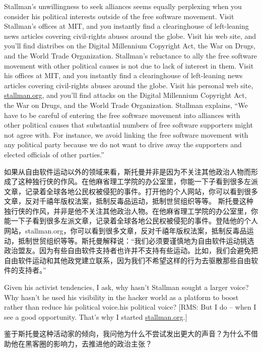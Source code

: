\ifdefined\eng
\ifdefined\vone
Stallman's unwillingness to seek alliances seems equally perplexing when you consider his political interests outside of the free software movement. Visit Stallman's offices at MIT, and you instantly find a clearinghouse of left-leaning news articles covering civil-rights abuses around the globe. Visit his web site, and you'll find diatribes on the Digital Millennium Copyright Act, the War on Drugs, and the World Trade Organization.
\fi
\ifdefined\vtwo
Stallman's reluctance to ally the free software movement with other political causes is not due to lack of interest in them.  Visit his offices at MIT, and you instantly find a clearinghouse of left-leaning news articles covering civil-rights abuses around the globe. Visit his personal web site, \url{stallman.org}, and you'll find attacks on the Digital Millennium Copyright Act, the War on Drugs, and the World Trade Organization.  Stallman explains, ``We have to be careful of entering the free software movement into alliances with other political causes that substantial numbers of free software supporters might not agree with.  For instance, we avoid linking the free software movement with any political party because we do not want to drive away the supporters and elected officials of other parties.''
\fi
\fi

\ifdefined\chs
\ifdefined\vone
如果从自由软件运动以外的领域来看，斯托曼并非是因为不关注其他政治人物而形成了这种独行侠的作风。在他麻省理工学院的办公室里，你能一下子看到很多左派文章，记录着全球各地公民权被侵犯的事件。打开他的个人网站，你可以看到很多文章，反对千禧年版权法案，抵制反毒品运动，抵制世贸组织等等。
\fi
\ifdefined\vtwo
斯托曼这种独行侠的作风，并非是他不关注其他政治人物。在他麻省理工学院的办公室里，你能一下子看到很多左派文章，记录着全球各地公民权被侵犯的事件。登陆他的个人网站，stallman.org，你可以看到很多文章，反对千禧年版权法案，抵制反毒品运动，抵制世贸组织等等。斯托曼解释说：``我们必须要谨慎地为自由软件运动挑选政治盟友。因为有些自由软件支持者也许并不支持有些运动。比如，我们会避免把自由软件运动和其他政党建立联系，因为我们不希望这样的行为去驱散那些自由软件的支持者。''
\fi
\fi

\ifdefined\eng
Given his activist tendencies, I ask, why hasn't Stallman sought a larger voice? Why hasn't he used his visibility in the hacker world as a platform to boost \ifdefined\vone rather than reduce his political voice.\fi\ifdefined\vtwo his political voice? [RMS: But I do -- when I see a good opportunity.  That's why I started \url{stallman.org}.]\fi
\fi

\ifdefined\chs
鉴于斯托曼这种活动家的倾向，我问他为什么不尝试发出更大的声音？为什么不借助他在黑客圈的影响力，去推进他的政治主张？\ifdefined{} \fi
\fi

